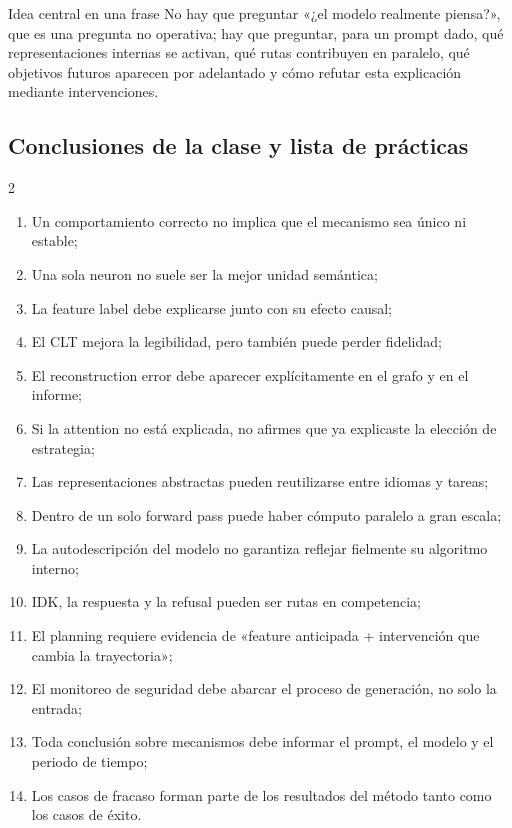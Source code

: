 \documentclass[a4paper]{article}
\begin{document}
\begin{importantbox}{Idea central en una frase}
No hay que preguntar «¿el modelo realmente piensa?», que es una pregunta no operativa; hay que preguntar, para un prompt dado, qué representaciones internas se activan, qué rutas contribuyen en paralelo, qué objetivos futuros aparecen por adelantado y cómo refutar esta explicación mediante intervenciones.
\end{importantbox}

\subsection{Conclusiones de la clase y lista de prácticas}

\small
\begin{multicols}{2}
\begin{enumerate}
  \item Un comportamiento correcto no implica que el mecanismo sea único ni estable;
  \item Una sola neuron no suele ser la mejor unidad semántica;
  \item La feature label debe explicarse junto con su efecto causal;
  \item El CLT mejora la legibilidad, pero también puede perder fidelidad;
  \item El reconstruction error debe aparecer explícitamente en el grafo y en el informe;
  \item Si la attention no está explicada, no afirmes que ya explicaste la elección de estrategia;
  \item Las representaciones abstractas pueden reutilizarse entre idiomas y tareas;
  \item Dentro de un solo forward pass puede haber cómputo paralelo a gran escala;
  \item La autodescripción del modelo no garantiza reflejar fielmente su algoritmo interno;
  \item IDK, la respuesta y la refusal pueden ser rutas en competencia;
  \item El planning requiere evidencia de «feature anticipada + intervención que cambia la trayectoria»;
  \item El monitoreo de seguridad debe abarcar el proceso de generación, no solo la entrada;
  \item Toda conclusión sobre mecanismos debe informar el prompt, el modelo y el periodo de tiempo;
  \item Los casos de fracaso forman parte de los resultados del método tanto como los casos de éxito.
\end{enumerate}
\end{multicols}
\normalsize
\end{document}
